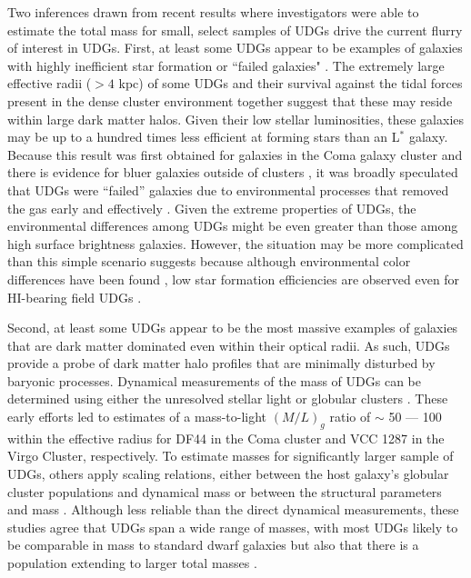 \documentclass[twocolumn,tighten]{aastex63}
\begin{document}
Two inferences drawn from recent results where investigators were able to estimate the total mass for small, select samples of UDGs
drive the current flurry of interest in UDGs. First, at least some UDGs appear to be examples of galaxies with highly inefficient star formation or ``failed galaxies" \citep{vanDokkum2015a}. The extremely large effective radii ($> 4$ kpc) of some UDGs and their survival against the tidal forces present in the dense cluster environment together suggest that these may reside within large dark matter halos. Given their
low stellar luminosities,  these galaxies may be up to a hundred times less efficient at forming stars than an L$^*$ galaxy.  Because this result was first obtained for galaxies in the Coma galaxy cluster \citep{vanDokkum2015a,Koda2015} and there is evidence for bluer galaxies outside of clusters \citep{Roman2017a,Roman2017b}, it was broadly speculated that UDGs were ``failed'' galaxies due to  environmental processes that removed the gas early and effectively \citep[e.g.,][]{vanDokkum2015a,Roman2017b}. Given the extreme properties of UDGs, the environmental differences among UDGs might be even greater than those among high surface brightness galaxies. However, the situation may be more complicated than this simple scenario suggests because although environmental color differences have been found \citep{Roman2017a, greco, tanog},
low star formation efficiencies are observed even for HI-bearing field UDGs \citep{Leisman2017}.

Second, at least some UDGs appear to be the most massive examples of galaxies that are dark matter dominated even within their optical radii. As such, UDGs provide a probe of dark matter halo profiles that are minimally disturbed by baryonic processes. 
Dynamical measurements of the mass of UDGs can be determined using either the unresolved stellar light \citep{vanDokkum2016} or globular clusters \citep{Beasley2016a}. These early efforts led to estimates of a mass-to-light $(M/L)_g$ ratio of $\sim$ 50 --- 100 within the effective radius for DF44 in the Coma cluster and VCC 1287 in the Virgo Cluster, respectively. To estimate masses for significantly larger sample of UDGs, others apply scaling relations, either between the host galaxy's globular cluster populations and dynamical mass \citep{Blakeslee1997, Peng2008, Spitler2009, Harris2013, Harris2017}
or between the structural parameters and mass \citep{Zaritsky2017, Lee2020}. Although less reliable than the direct dynamical measurements, these studies agree that UDGs span a wide range of masses, with most UDGs likely to be comparable in mass to standard dwarf galaxies \citep[e.g.,][] {Amorisco2018} but also that there is a population extending to larger total masses  \citep[$>10^{11}$ M$_\odot$;][]{Zaritsky2017, Forbes2020, Lee2020}.
\end{document}
